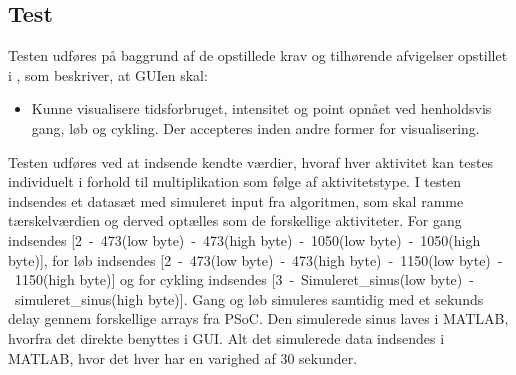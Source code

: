 \subsection{Test}
Testen udføres på baggrund af de opstillede krav og tilhørende afvigelser opstillet i , som beskriver, at GUIen skal:
\begin{itemize}
	\item Kunne visualisere tidsforbruget, intensitet og point opnået ved henholdsvis gang, løb og cykling. Der accepteres inden andre former for visualisering.
\end{itemize}

Testen udføres ved at indsende kendte værdier, hvoraf hver aktivitet kan testes individuelt i forhold til multiplikation som følge af aktivitetstype. I testen indsendes et datasæt med simuleret input fra algoritmen, som skal ramme tærskelværdien og derved optælles som de forskellige aktiviteter. For gang indsendes [2~-~473(low byte)~-~473(high byte)~-~1050(low byte)~-~1050(high byte)], for løb indsendes [2~-~473(low byte)~-~473(high byte)~-~1150(low byte)~-~1150(high byte)] og for cykling indsendes [3~-~Simuleret\_sinus(low byte)~-~simuleret\_sinus(high byte)]. Gang og løb simuleres samtidig med et sekunds delay gennem forskellige arrays fra PSoC. Den simulerede sinus laves i MATLAB, hvorfra det direkte benyttes i GUI. Alt det simulerede data indsendes i MATLAB, hvor det hver har en varighed af 30 sekunder.

